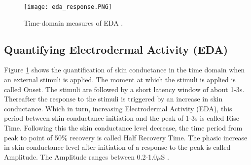 \begin{figure}
    \centering
    \texttt{[image: eda\_response.PNG]}
    \caption{Time-domain measures of EDA \cite{cacioppo_electrodermal_2016_p_217_243}.}
    \label{fig:eda_graph}
\end{figure}

\subsection{Quantifying Electrodermal Activity (EDA)}
\label{sec:quantify_eda}
Figure \ref{fig:eda_graph} shows the quantification of skin conductance in the time domain when an external stimuli is applied. The moment at which the stimuli is applied is called Onset. The stimuli are followed by a short latency window of about 1-3s. Thereafter the response to the stimuli is triggered by an increase in skin conductance. Which in turn, increasing Electrodermal Activity (EDA), this period between skin conductance initiation and the peak of 1-3s is called Rise Time. Following this the skin conductance level decrease, the time period from peak to point of 50$\%$ recovery is called Half Recovery Time. The phasic increase in skin conductance level after initiation of a response to the peak is called Amplitude. The Amplitude ranges between 0.2-1.0$\mu$S \cite{cacioppo_electrodermal_2016_p_217_243}.

